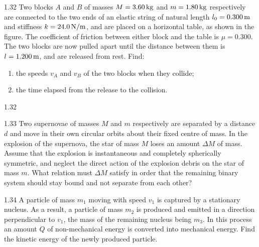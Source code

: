 \begin{problem}{1.32}
Two blocks $A$ and $B$ of masses $M=3.60\,\mathrm{kg}$ and $m=1.80\,\mathrm{kg}$ respectively are connected to the two ends of an elastic string of natural length $l_0=0.300\,\mathrm{m}$ and stiffness $k=24.0\,\mathrm{N/m}$, and are placed on a horizontal table, as shown in the figure. The coefficient of friction between either block and the table is $\mu=0.300$. The two blocks are now pulled apart until the distance between them is $l=1.200\,\mathrm{m}$, and are released from rest. Find:
\begin{enumerate}[label=(\arabic*),leftmargin=2.2em,itemsep=1pt,topsep=2pt]
\item the speeds $v_A$ and $v_B$ of the two blocks when they collide;
\item the time elapsed from the release to the collision.
\end{enumerate}
\end{problem}

\begin{figbox}{1.32}
\end{figbox}

\begin{problem}{1.33}
Two supernovae of masses $M$ and $m$ respectively are separated by a distance $d$ and move in their own circular orbits about their fixed centre of mass. In the explosion of the supernova, the star of mass $M$ loses an amount $\Delta M$ of mass. Assume that the explosion is instantaneous and completely spherically symmetric, and neglect the direct action of the explosion debris on the star of mass $m$. What relation must $\Delta M$ satisfy in order that the remaining binary system should stay bound and not separate from each other?
\end{problem}

\begin{problem}{1.34}
A particle of mass $m_1$ moving with speed $v_1$ is captured by a stationary nucleus. As a result, a particle of mass $m_2$ is produced and emitted in a direction perpendicular to $v_1$, the mass of the remaining nucleus being $m_3$. In this process an amount $Q$ of non-mechanical energy is converted into mechanical energy. Find the kinetic energy of the newly produced particle.
\end{problem}

